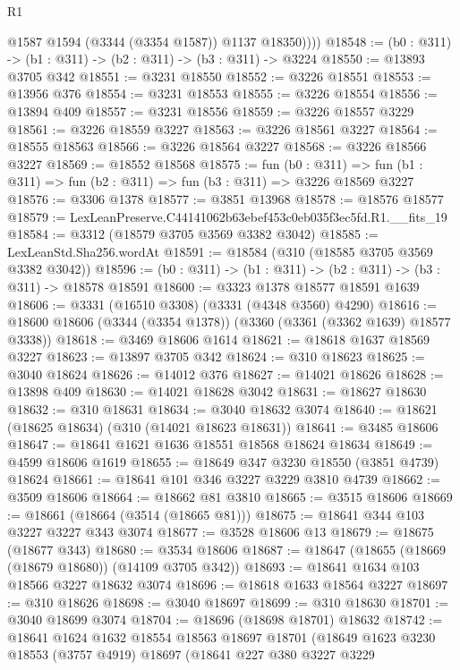 \begin{lexlean}{R1}
\begin{coremodule}
            @1587
            @1594
            (@3344 (@3354 @1587))
            @1137
            @18350))))
@18548 := (b0 : @311) -> (b1 : @311) -> (b2 : @311) -> (b3 : @311) -> @3224
@18550 := @13893 @3705 @342
@18551 := @3231 @18550
@18552 := @3226 @18551
@18553 := @13956 @376
@18554 := @3231 @18553
@18555 := @3226 @18554
@18556 := @13894 @409
@18557 := @3231 @18556
@18559 := @3226 @18557 @3229
@18561 := @3226 @18559 @3227
@18563 := @3226 @18561 @3227
@18564 := @18555 @18563
@18566 := @3226 @18564 @3227
@18568 := @3226 @18566 @3227
@18569 := @18552 @18568
@18575 := fun (b0 : @311) =>
  fun (b1 : @311) => fun (b2 : @311) => fun (b3 : @311) => @3226 @18569 @3227
@18576 := @3306 @1378
@18577 := @3851 @13968
@18578 := @18576 @18577
@18579 := LexLeanPreserve.C44141062b63ebef453c0eb035f3ec5fd.R1.__fits_19
@18584 := @3312 (@18579 @3705 @3569 @3382 @3042)
@18585 := LexLeanStd.Sha256.wordAt
@18591 := @18584 (@310 (@18585 @3705 @3569 @3382 @3042))
@18596 := (b0 : @311) -> (b1 : @311) -> (b2 : @311) -> (b3 : @311) -> @18578 @18591
@18600 := @3323 @1378 @18577 @18591 @1639
@18606 := @3331 (@16510 @3308) (@3331 (@4348 @3560) @4290)
@18616 := @18600 @18606 (@3344 (@3354 @1378)) (@3360 (@3361 (@3362 @1639) @18577 @3338))
@18618 := @3469 @18606 @1614
@18621 := @18618 @1637 @18569 @3227
@18623 := @13897 @3705 @342
@18624 := @310 @18623
@18625 := @3040 @18624
@18626 := @14012 @376
@18627 := @14021 @18626
@18628 := @13898 @409
@18630 := @14021 @18628 @3042
@18631 := @18627 @18630
@18632 := @310 @18631
@18634 := @3040 @18632 @3074
@18640 := @18621 (@18625 @18634) (@310 (@14021 @18623 @18631))
@18641 := @3485 @18606
@18647 := @18641 @1621 @1636 @18551 @18568 @18624 @18634
@18649 := @4599 @18606 @1619
@18655 := @18649 @347 @3230 @18550 (@3851 @4739) @18624
@18661 := @18641 @101 @346 @3227 @3229 @3810 @4739
@18662 := @3509 @18606
@18664 := @18662 @81 @3810
@18665 := @3515 @18606
@18669 := @18661 (@18664 (@3514 (@18665 @81)))
@18675 := @18641 @344 @103 @3227 @3227 @343 @3074
@18677 := @3528 @18606 @13
@18679 := @18675 (@18677 @343)
@18680 := @3534 @18606
@18687 := @18647 (@18655 (@18669 (@18679 @18680)) (@14109 @3705 @342))
@18693 := @18641 @1634 @103 @18566 @3227 @18632 @3074
@18696 := @18618 @1633 @18564 @3227
@18697 := @310 @18626
@18698 := @3040 @18697
@18699 := @310 @18630
@18701 := @3040 @18699 @3074
@18704 := @18696 (@18698 @18701) @18632
@18742 := @18641
    @1624
    @1632
    @18554
    @18563
    @18697
    @18701
    (@18649
      @1623
      @3230
      @18553
      (@3757 @4919)
      @18697
      (@18641
        @227
        @380
        @3227
        @3229

\end{coremodule}
\end{lexlean}
